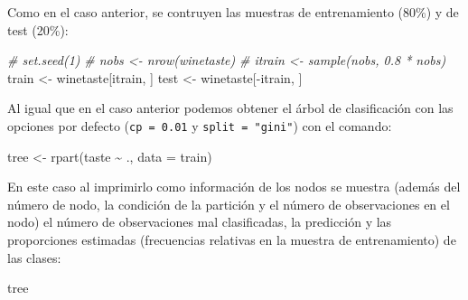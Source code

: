\documentclass[
  spanish,
]{book}
\newenvironment{Shaded}{\begin{snugshade}}{\end{snugshade}}
\newcommand{\AttributeTok}[1]{\textcolor[rgb]{0.77,0.63,0.00}{#1}}
\newcommand{\CommentTok}[1]{\textcolor[rgb]{0.56,0.35,0.01}{\textit{#1}}}
\newcommand{\FunctionTok}[1]{\textcolor[rgb]{0.00,0.00,0.00}{#1}}
\newcommand{\NormalTok}[1]{#1}
\newcommand{\OtherTok}[1]{\textcolor[rgb]{0.56,0.35,0.01}{#1}}
\newcommand{\SpecialCharTok}[1]{\textcolor[rgb]{0.00,0.00,0.00}{#1}}
\theoremstyle{break}
\theoremstyle{definition}
\theoremstyle{definition}
\theoremstyle{definition}
\theoremstyle{definition}
\theoremstyle{remark}
\begin{document}
Como en el caso anterior, se contruyen las muestras de entrenamiento (80\%) y de test (20\%):

\begin{Shaded}
\begin{Highlighting}[]
\CommentTok{\# set.seed(1)}
\CommentTok{\# nobs \textless{}{-} nrow(winetaste)}
\CommentTok{\# itrain \textless{}{-} sample(nobs, 0.8 * nobs)}
\NormalTok{train }\OtherTok{\textless{}{-}}\NormalTok{ winetaste[itrain, ]}
\NormalTok{test }\OtherTok{\textless{}{-}}\NormalTok{ winetaste[}\SpecialCharTok{{-}}\NormalTok{itrain, ]}
\end{Highlighting}
\end{Shaded}

Al igual que en el caso anterior podemos obtener el árbol de clasificación con las opciones por defecto (\texttt{cp\ =\ 0.01} y \texttt{split\ =\ "gini"}) con el comando:

\begin{Shaded}
\begin{Highlighting}[]
\NormalTok{tree }\OtherTok{\textless{}{-}} \FunctionTok{rpart}\NormalTok{(taste }\SpecialCharTok{\textasciitilde{}}\NormalTok{ ., }\AttributeTok{data =}\NormalTok{ train)}
\end{Highlighting}
\end{Shaded}

En este caso al imprimirlo como información de los nodos se muestra (además del número de nodo, la condición de la partición y el número de observaciones en el nodo) el número de observaciones mal clasificadas, la predicción y las proporciones estimadas (frecuencias relativas en la muestra de entrenamiento) de las clases:

\begin{Shaded}
\begin{Highlighting}[]
\NormalTok{tree}
\end{Highlighting}
\end{Shaded}
\end{document}
